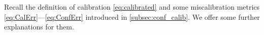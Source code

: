 Recall the definition of calibration \cref{eq:calibrated} and some miscalibration metrics \cref{eq:CalErr}---\eqref{eq:ConfErr} introduced in \cref{subsec:conf_calib}. We offer some further explanations for them.
